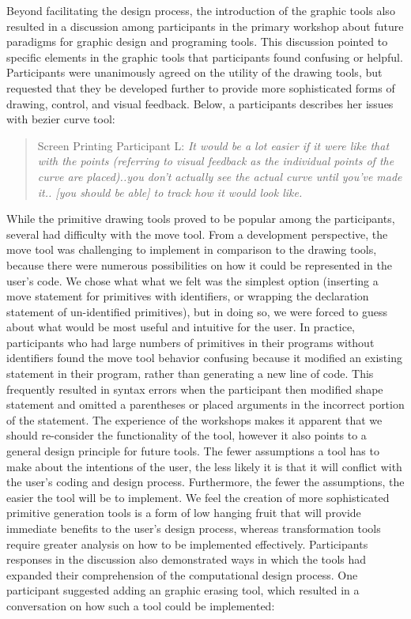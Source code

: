 \documentclass{sigchi}
\begin{document}
Beyond facilitating the design process, the introduction of the graphic tools also resulted in a discussion among participants in the primary workshop about future paradigms for graphic design and programing tools. This discussion pointed to specific elements in the graphic tools that participants found confusing or helpful. Participants were unanimously agreed on the utility of the drawing tools, but requested that they be developed further to provide more sophisticated forms of drawing, control, and visual feedback. Below, a participants describes her issues with bezier curve tool:%
\begin{quotation}
Screen Printing Participant L:\textit{ It would be a lot easier if it were like that with the points (referring to visual feedback as the individual points of the curve are placed)..you don't actually see the actual curve until you've made it.. [you should be able] to track how it would look like.}
\end{quotation}

While the primitive drawing tools proved to be popular among the participants, several had difficulty with the move tool. From a development perspective, the move tool was challenging to implement in comparison to the drawing tools, because there were numerous possibilities on how it could be represented in the user's code. We chose what what we felt was the simplest option (inserting a move statement for primitives with identifiers, or wrapping the declaration statement of un-identified primitives), but in doing so, we were forced to guess about what would be most useful and intuitive for the user. In practice, participants who had large numbers of primitives in their programs without identifiers found the move tool behavior confusing because it modified an existing statement in their program, rather than generating a new line of code. This frequently resulted in syntax errors when the participant then modified shape statement and omitted a parentheses or placed arguments in the incorrect portion of the statement. The experience of the workshops makes it apparent that we should re-consider the functionality of the tool, however it also points to a general design principle for future tools. The fewer assumptions a tool has to make about the intentions of the user, the less likely it is that it will conflict with the user's coding and design process. Furthermore, the fewer the assumptions, the easier the tool will be to implement. We feel the creation of more sophisticated primitive generation tools is a form of low hanging fruit that will provide immediate benefits to the user's design process, whereas transformation tools require greater analysis on how to be implemented effectively. Participants responses in the discussion also demonstrated ways in which the tools had expanded their comprehension of the computational design process. One participant suggested adding an graphic erasing tool, which resulted in a conversation on how such a tool could be implemented:
\end{document}
